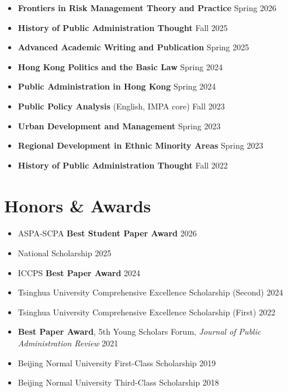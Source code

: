 \documentclass[11pt, a4paper]{article}
\begin{document}
\begin{itemize}[itemsep=4pt]
    \item \textbf{Frontiers in Risk Management Theory and Practice}
    \hfill Spring 2026

    \item \textbf{History of Public Administration Thought}
    \hfill Fall 2025

    \item \textbf{Advanced Academic Writing and Publication}
    \hfill Spring 2025

    \item \textbf{Hong Kong Politics and the Basic Law}
    \hfill Spring 2024

    \item \textbf{Public Administration in Hong Kong}
    \hfill Spring 2024

    \item \textbf{Public Policy Analysis} {\small (English, IMPA core)}
    \hfill Fall 2023

    \item \textbf{Urban Development and Management}
    \hfill Spring 2023

    \item \textbf{Regional Development in Ethnic Minority Areas}
    \hfill Spring 2023

    \item \textbf{History of Public Administration Thought}
    \hfill Fall 2022
\end{itemize}

\section{Honors \& Awards}
\begin{itemize}
    \item ASPA-SCPA \textbf{Best Student Paper Award}
    \hfill 2026
    \item National Scholarship
    \hfill 2025
    \item ICCPS \textbf{Best Paper Award}
    \hfill 2024
    \item Tsinghua University Comprehensive Excellence Scholarship (Second)
    \hfill 2024
    \item Tsinghua University Comprehensive Excellence Scholarship (First)
    \hfill 2022
    \item \textbf{Best Paper Award}, 5th Young Scholars Forum,
    \textit{Journal of Public Administration Review}
    \hfill 2021
    \item Beijing Normal University First-Class Scholarship
    \hfill 2019
    \item Beijing Normal University Third-Class Scholarship
    \hfill 2018
\end{itemize}
\end{document}
